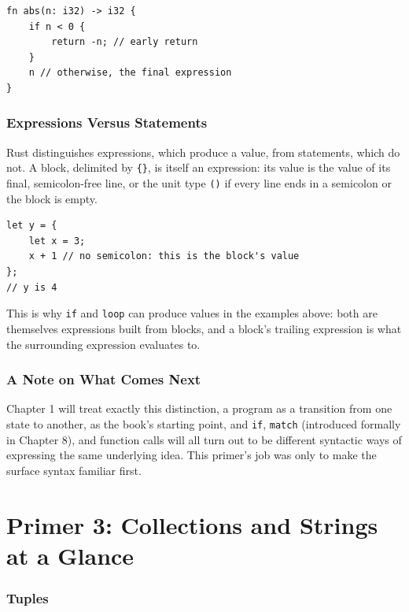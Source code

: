 \documentclass[11pt]{book}
\begin{document}
\begin{lstlisting}
fn abs(n: i32) -> i32 {
    if n < 0 {
        return -n; // early return
    }
    n // otherwise, the final expression
}
\end{lstlisting}

\subsection*{Expressions Versus Statements}

Rust distinguishes expressions, which produce a value, from statements, which do not. A block, delimited by \texttt{\{\}}, is itself an expression: its value is the value of its final, semicolon-free line, or the unit type \texttt{()} if every line ends in a semicolon or the block is empty.

\begin{lstlisting}
let y = {
    let x = 3;
    x + 1 // no semicolon: this is the block's value
};
// y is 4
\end{lstlisting}

This is why \texttt{if} and \texttt{loop} can produce values in the examples above: both are themselves expressions built from blocks, and a block's trailing expression is what the surrounding expression evaluates to.

\subsection*{A Note on What Comes Next}

Chapter 1 will treat exactly this distinction, a program as a transition from one state to another, as the book's starting point, and \texttt{if}, \texttt{match} (introduced formally in Chapter 8), and function calls will all turn out to be different syntactic ways of expressing the same underlying idea. This primer's job was only to make the surface syntax familiar first.

\clearpage

\chapter*{Primer 3: Collections and Strings at a Glance}

\subsection*{Tuples}
\end{document}
